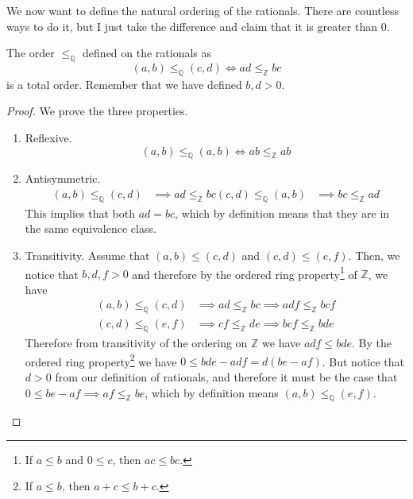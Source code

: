 \documentclass{article}
\begin{document}
      We now want to define the natural ordering of the rationals. There are countless ways to do it, but I just take the difference and claim that it is greater than $0$. 

      \begin{theorem}
        The order $\leq_{\mathbb{Q}}$ defined on the rationals as 
        \begin{equation}
          (a, b) \leq_{\mathbb{Q}} (c, d) \iff ad \leq_{\mathbb{Z}} bc
        \end{equation}
        is a total order. Remember that we have defined $b, d > 0$. 
      \end{theorem}
      \begin{proof}
        We prove the three properties. 
        \begin{enumerate}
          \item Reflexive. 
          \begin{equation}
            (a, b) \leq_{\mathbb{Q}} (a, b) \iff ab \leq_{\mathbb{Z}} ab
          \end{equation} 

          \item Antisymmetric. 
          \begin{align}
            (a, b) \leq_{\mathbb{Q}} (c, d) & \implies ad \leq_{\mathbb{Z}} bc
            (c, d) \leq_{\mathbb{Q}} (a, b) & \implies bc \leq_{\mathbb{Z}} ad
          \end{align} 
          This implies that both $ad = bc$, which by definition means that they are in the same equivalence class. 

          \item Transitivity. Assume that $(a, b) \leq (c, d)$ and $(c, d) \leq (e, f)$. Then, we notice that $b, d, f > 0$ and therefore by the ordered ring property\footnote{If $a \leq b$ and $0 \leq c$, then $ac \leq bc$.} of $\mathbb{Z}$, we have 
          \begin{align}
            (a, b) \leq_{\mathbb{Q}} (c, d) & \implies ad \leq_{\mathbb{Z}} bc \implies adf \leq_{\mathbb{Z}} bcf \\ 
            (c, d) \leq_{\mathbb{Q}} (e, f) & \implies cf \leq_{\mathbb{Z}} de \implies bcf \leq_{\mathbb{Z}} bde
          \end{align}
          Therefore from transitivity of the ordering on $\mathbb{Z}$ we have $adf \leq bde$. By the ordered ring property\footnote{If $a \leq b$, then $a + c \leq b + c$.}  we have $0 \leq bde - adf = d(be - af)$. But notice that $d > 0$ from our definition of rationals, and therefore it must be the case that $0 \leq be - af \implies af \leq_{\mathbb{Z}} be$, which by definition means $(a, b) \leq_{\mathbb{Q}} (e, f)$. 
        \end{enumerate}
      \end{proof} 
\end{document}
